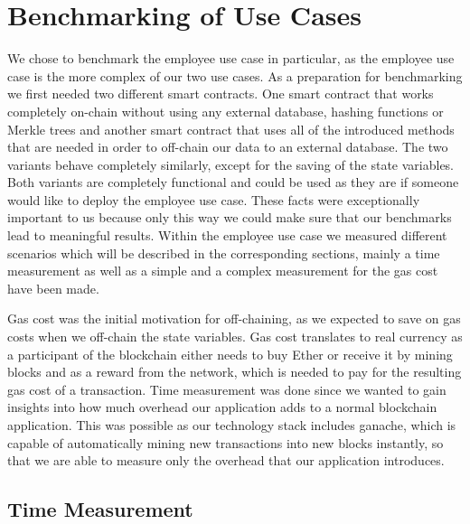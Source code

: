 \section{Benchmarking of Use Cases}

We chose to benchmark the employee use case in particular, as the employee use case is the more complex of our two use cases.
As a preparation for benchmarking we first needed two different smart contracts.
One smart contract that works completely on-chain without using any external database, hashing functions or Merkle trees and another smart contract that uses all of the introduced methods that are needed in order to off-chain our data to an external database.
The two variants behave completely similarly, except for the saving of the state variables.
Both variants are completely functional and could be used as they are if someone would like to deploy the employee use case.
These facts were exceptionally important to us because only this way we could make sure that our benchmarks lead to meaningful results.
Within the employee use case we measured different scenarios which will be described in the corresponding sections, mainly a time measurement as well as a simple and a complex measurement for the gas cost have been made.

Gas cost was the initial motivation for off-chaining, as we expected to save on gas costs when we off-chain the state variables.
Gas cost translates to real currency as a participant of the blockchain either needs to buy Ether or receive it by mining blocks and as a reward from the network, which is needed to pay for the resulting gas cost of a transaction.
Time measurement was done since we wanted to gain insights into how much overhead our application adds to a normal blockchain application.
This was possible as our technology stack includes ganache, which is capable of automatically mining new transactions into new blocks instantly, so that we are able to measure only the overhead that our application introduces.

\subsection{Time Measurement}


